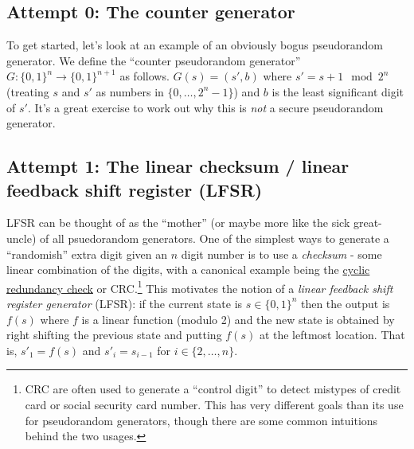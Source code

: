 \subsection{Attempt 0: The counter
generator}\label{Attempt--The-counter-generator}

To get started, let's look at an example of an obviously bogus
pseudorandom generator. We define the ``counter pseudorandom generator''
\(G:\{0,1\}^n \rightarrow \{0,1\}^{n+1}\) as follows. \(G(s)=(s',b)\)
where \(s' = s + 1 \mod 2^n\) (treating \(s\) and \(s'\) as numbers in
\(\{0,\ldots,2^n-1\}\)) and \(b\) is the least significant digit of
\(s'\). It's a great exercise to work out why this is \emph{not} a
secure pseudorandom generator.


\subsection{Attempt 1: The linear checksum / linear feedback shift
register (LFSR)}\label{Attempt--The-linear-checksum--}

LFSR can be thought of as the ``mother'' (or maybe more like the sick
great-uncle) of all psuedorandom generators. One of the simplest ways to
generate a ``randomish'' extra digit given an \(n\) digit number is to
use a \emph{checksum} - some linear combination of the digits, with a
canonical example being the
\href{https://en.wikipedia.org/wiki/Cyclic_redundancy_check}{cyclic
redundancy check} or CRC.\footnote{CRC are often used to generate a
  ``control digit'' to detect mistypes of credit card or social security
  card number. This has very different goals than its use for
  pseudorandom generators, though there are some common intuitions
  behind the two usages.} This motivates the notion of a \emph{linear
feedback shift register generator} (LFSR): if the current state is
\(s\in\{0,1\}^n\) then the output is \(f(s)\) where \(f\) is a linear
function (modulo 2) and the new state is obtained by right shifting the
previous state and putting \(f(s)\) at the leftmost location. That is,
\(s'_1 = f(s)\) and \(s'_i = s_{i-1}\) for \(i\in\{2,\ldots,n\}\).

